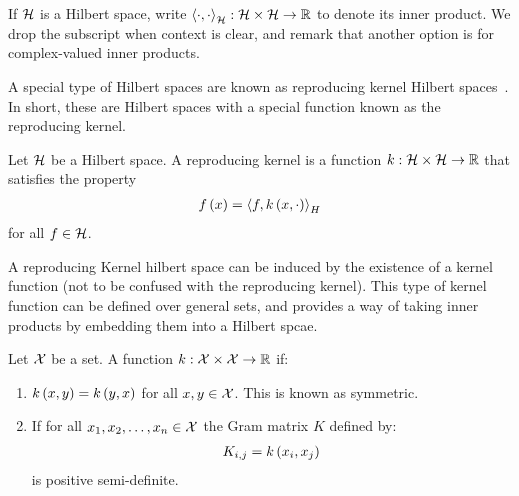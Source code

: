 \documentclass[12pt]{article}
\begin{document}
If \(\mathcal{H}\) is a Hilbert space,
write
\(\left\langle\cdot, \cdot\right\rangle_{\mathcal{H}} : \mathcal{H} \times \mathcal{H} \to \mathbb{R}\)
to denote its inner product.
We drop the subscript when context is clear,
and remark that another option is for complex-valued inner products.

A special type of Hilbert spaces are known as
reproducing kernel Hilbert spaces~\cite{berlinet2011reproducing}.
In short,
these are Hilbert spaces with a special function known
as the reproducing kernel.


\begin{definition}
  Let \(\mathcal{H}\) be a Hilbert space.
  A reproducing kernel is a function
  \(k : \mathcal{H} \times \mathcal{H} \to \mathbb{R}\)
  that satisfies the property
  \begin{align*}
    f\left(x\right) = \left\langle f, k\left(x, \cdot\right)\right\rangle_H
  \end{align*}
  for all \(f \in \mathcal{H}\).
\end{definition}

A reproducing Kernel hilbert space can be induced by the existence
of a kernel function (not to be confused with the reproducing kernel).
This type of kernel function can be defined over general sets,
and provides a way of taking inner products by embedding them
into a Hilbert spcae.

\begin{definition}[Kernel]
  Let \(\mathcal{X}\) be a set.
  A function \(k : \mathcal{X} \times \mathcal{X} \to \mathbb{R}\) if:

  \begin{enumerate}
    \item
      \(k\left(x, y\right) = k\left(y, x\right)\) for all \(x, y \in \mathcal{X}\).
      This is known as symmetric.

    \item
      If for all \(x_1, x_2, \ldots, x_n \in \mathcal{X}\)
      the Gram matrix \(K\)
      defined by:
      \begin{align*}
        K_{i, j} = k\left(x_i, x_j\right)
      \end{align*}
      is positive semi-definite.

  \end{enumerate}

\end{definition}
\end{document}

